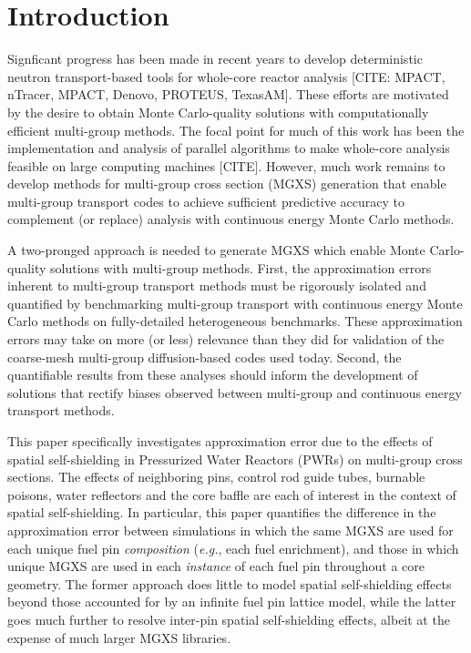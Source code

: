 \section{Introduction}
\label{sec:intro}

Signficant progress has been made in recent years to develop deterministic neutron transport-based tools for whole-core reactor analysis [CITE: MPACT, nTracer, MPACT, Denovo, PROTEUS, TexasAM]. These efforts are motivated by the desire to obtain Monte Carlo-quality solutions with computationally efficient multi-group methods. The focal point for much of this work has been the implementation and analysis of parallel algorithms to make whole-core analysis feasible on large computing machines [CITE]. However, much work remains to develop methods for multi-group cross section (MGXS) generation that enable multi-group transport codes to achieve sufficient predictive accuracy to complement (or replace) analysis with continuous energy Monte Carlo methods.

A two-pronged approach is needed to generate MGXS which enable Monte Carlo-quality solutions with multi-group methods. First, the approximation errors inherent to multi-group transport methods must be rigorously isolated and quantified by benchmarking multi-group transport with continuous energy Monte Carlo methods on fully-detailed heterogeneous benchmarks. These approximation errors may take on more (or less) relevance than they did for validation of the coarse-mesh multi-group diffusion-based codes used today. Second, the quantifiable results from these analyses should inform the development of solutions that rectify biases observed between multi-group and continuous energy transport methods.

This paper specifically investigates approximation error due to the effects of spatial self-shielding in Pressurized Water Reactors (PWRs) on multi-group cross sections. The effects of neighboring pins, control rod guide tubes, burnable poisons, water reflectors and the core baffle are each of interest in the context of spatial self-shielding. In particular, this paper quantifies the difference in the approximation error between simulations in which the same MGXS are used for each unique fuel pin \textit{composition} (\textit{e.g.}, each fuel enrichment), and those in which unique MGXS are used in each \textit{instance} of each fuel pin throughout a core geometry. The former approach does little to model spatial self-shielding effects beyond those accounted for by an infinite fuel pin lattice model, while the latter goes much further to resolve inter-pin spatial self-shielding effects, albeit at the expense of much larger MGXS libraries.

